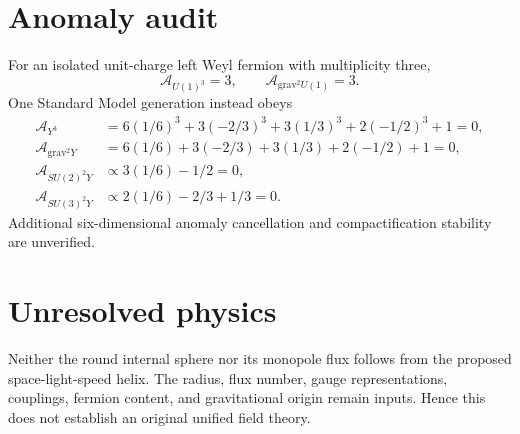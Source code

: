 \documentclass[11pt]{article}
\begin{document}
\section{Anomaly audit}
For an isolated unit-charge left Weyl fermion with multiplicity three,
\begin{equation}\mathcal A_{U(1)^3}=3,\qquad\mathcal A_{\mathrm{grav}^2 U(1)}=3.\end{equation}
One Standard Model generation instead obeys
\begin{align}
\mathcal A_{Y^3}&=6(1/6)^3+3(-2/3)^3+3(1/3)^3+2(-1/2)^3+1=0,\\
\mathcal A_{\mathrm{grav}^2Y}&=6(1/6)+3(-2/3)+3(1/3)+2(-1/2)+1=0,\\
\mathcal A_{SU(2)^2Y}&\propto3(1/6)-1/2=0,\\
\mathcal A_{SU(3)^2Y}&\propto2(1/6)-2/3+1/3=0.
\end{align}
Additional six-dimensional anomaly cancellation and compactification stability are unverified.
\section{Unresolved physics}
Neither the round internal sphere nor its monopole flux follows from the proposed
space-light-speed helix. The radius, flux number, gauge representations, couplings,
fermion content, and gravitational origin remain inputs. Hence this does not
establish an original unified field theory.
\end{document}
